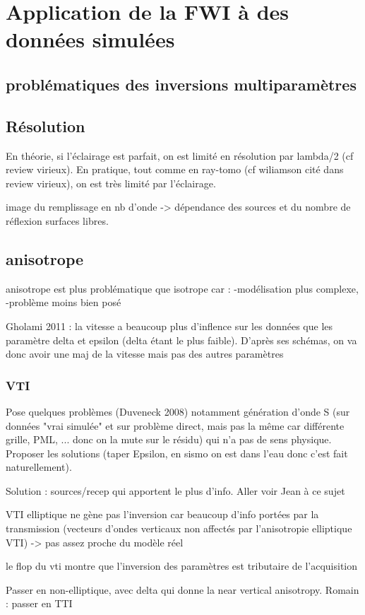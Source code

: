 \chapter{Application de la FWI à des données simulées}

\section{problématiques des inversions multiparamètres}



\section{Résolution}
En théorie, si l'éclairage est parfait, on est limité en résolution par lambda/2 (cf review virieux). En pratique, tout comme en ray-tomo (cf wiliamson cité dans review virieux), on est très limité par l'éclairage.

image du remplissage en nb d'onde -> dépendance des sources et du nombre de réflexion surfaces libres.

\section{anisotrope}

anisotrope est plus problématique que isotrope car : 
-modélisation plus complexe,
-problème moins bien posé

Gholami 2011 : la vitesse a beaucoup plus d'inflence sur les données que les paramètre delta et epsilon (delta étant le plus faible). D'après ses schémas, on va donc avoir une maj de la vitesse mais pas des autres paramètres

\subsection{VTI}
Pose quelques problèmes (Duveneck 2008) notamment génération d'onde S (sur données "vrai simulée"  et sur problème direct, mais pas la même car différente grille, PML, ... donc on la mute sur le résidu) qui n'a pas de sens physique. Proposer les solutions (taper Epsilon, en sismo on est dans l'eau donc c'est fait naturellement).


Solution : sources/recep qui apportent le plus d'info. Aller voir Jean à ce sujet


VTI elliptique ne gène pas l'inversion car beaucoup d'info portées par la transmission (vecteurs d'ondes verticaux non affectés par l'anisotropie elliptique VTI)  -> pas assez proche du modèle réel

le flop du vti montre que l'inversion des paramètres est tributaire de l'acquisition

Passer en non-elliptique, avec delta qui donne la near vertical anisotropy. Romain : passer en TTI

